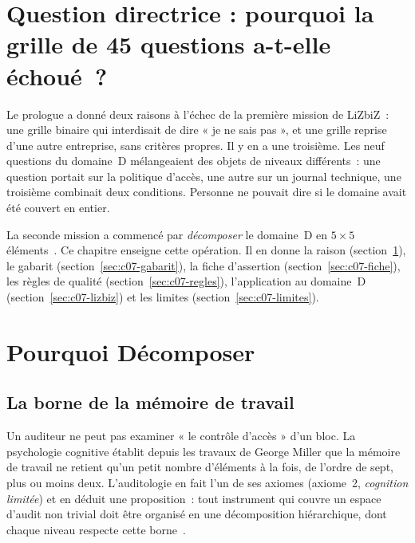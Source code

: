 \bigskip

\section*{Question directrice : pourquoi la grille de 45 questions a-t-elle échoué~?}

Le prologue a donné deux raisons à l'échec de la première mission de
LiZbiZ~: une grille binaire qui interdisait de dire « je ne sais pas », et
une grille reprise d'une autre entreprise, sans critères propres. Il y en a
une troisième. Les neuf questions du domaine~D mélangeaient des objets de
niveaux différents~: une question portait sur la politique d'accès, une
autre sur un journal technique, une troisième combinait deux conditions.
Personne ne pouvait dire si le domaine avait été couvert en entier.

La seconde mission a commencé par \emph{décomposer} le domaine~D en
$5 \times 5$ éléments~\cite{minka2026auditologie}. Ce chapitre enseigne
cette opération. Il en donne la raison (section~\ref{sec:c07-pourquoi}), le
gabarit (section~\ref{sec:c07-gabarit}), la fiche d'assertion
(section~\ref{sec:c07-fiche}), les règles de qualité
(section~\ref{sec:c07-regles}), l'application au domaine~D
(section~\ref{sec:c07-lizbiz}) et les limites (section~\ref{sec:c07-limites}).

\separateur

\section{Pourquoi Décomposer}
\label{sec:c07-pourquoi}

\subsection{La borne de la mémoire de travail}

Un auditeur ne peut pas examiner « le contrôle d'accès » d'un bloc. La
psychologie cognitive établit depuis les travaux de George Miller que la
mémoire de travail ne retient qu'un petit nombre d'éléments à la fois,
de l'ordre de sept, plus ou moins deux. L'auditologie en fait l'un de ses
axiomes (axiome~2, \emph{cognition limitée}) et en déduit une
proposition~: tout instrument qui couvre un espace d'audit non trivial doit
être organisé en une décomposition hiérarchique, dont chaque niveau respecte
cette borne~\cite{minka2026auditologie}.

